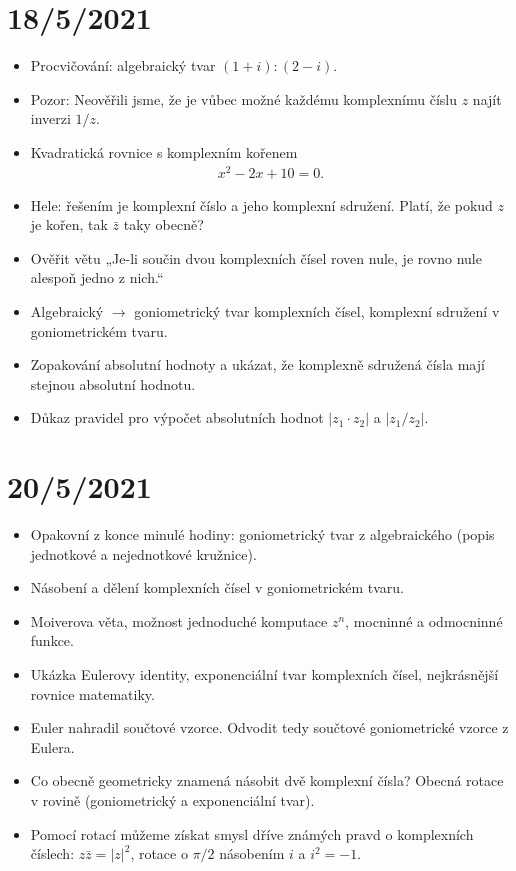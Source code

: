 \documentclass[11pt,a4paper]{article}
\begin{document}
    \section*{18/5/2021}
        \begin{itemize}
            \item Procvičování: algebraický tvar $(1+i):(2-i)$.
            \item Pozor: Neověřili jsme, že je vůbec možné každému komplexnímu číslu $z$ najít inverzi $1/z$.
            \item Kvadratická rovnice s komplexním kořenem
            \begin{align*}
                x^2-2x+10=0.
            \end{align*}
            \item Hele: řešením je komplexní číslo a jeho komplexní sdružení. Platí, že pokud $z$ je kořen, tak $\bar z$ taky obecně?
            \item Ověřit větu „Je-li součin dvou komplexních čísel roven nule, je rovno nule alespoň jedno z nich.“
            \item Algebraický $\rightarrow$ goniometrický tvar komplexních čísel, komplexní sdružení v goniometrickém tvaru.
            \item Zopakování absolutní hodnoty a ukázat, že komplexně sdružená čísla mají stejnou absolutní hodnotu.
            \item Důkaz pravidel pro výpočet absolutních hodnot $|z_1\cdot z_2|$ a $|z_1/z_2|$.
        \end{itemize}

    \section*{20/5/2021}
        \begin{itemize}
            \item Opakovní z konce minulé hodiny: goniometrický tvar z algebraického (popis jednotkové a nejednotkové kružnice).
            \item Násobení a dělení komplexních čísel v goniometrickém tvaru.
            \item Moiverova věta, možnost jednoduché komputace $z^n$, mocninné a odmocninné funkce.
            \item Ukázka Eulerovy identity, exponenciální tvar komplexních čísel, nejkrásnější rovnice matematiky.
            \item Euler nahradil součtové vzorce. Odvodit tedy součtové goniometrické vzorce z Eulera.
            \item Co obecně geometricky znamená násobit dvě komplexní čísla? Obecná rotace v rovině (goniometrický a exponenciální tvar).
            \item Pomocí rotací můžeme získat smysl dříve známých pravd o komplexních číslech: $z \bar z = |z|^2$, rotace o $\pi/2$ násobením $i$ a $i^2 = -1$.
        \end{itemize}
\end{document}
